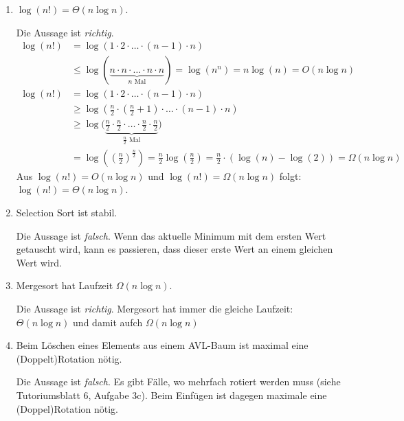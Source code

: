 \documentclass[11pt,a4paper]{article}
\begin{document}
\begin{loesung}
    \begin{enumerate}
        \item $\log(n!) = \Theta(n \log n)$.

        Die Aussage ist \emph{richtig}.
        \begin{align*}
            \log(n!) &= \log(1 \cdot 2 \cdot \ldots \cdot (n - 1) \cdot n) \\
            &\leq \log(\underbrace{n \cdot n \cdot \ldots \cdot n \cdot n}_{\text{$n$ Mal}}) 
            = \log(n^n) = n \log(n) = O(n\log n )
        \end{align*}
        \begin{align*}
            \log(n!) &= \log(1 \cdot 2 \cdot \ldots \cdot (n - 1) \cdot n) \\
            &\geq \log\left(\frac{n}{2} \cdot \left(\frac{n}{2} + 1\right) \cdot \ldots \cdot (n - 1) \cdot n\right)  \\
            &\geq \log\Big(\underbrace{\frac{n}{2} \cdot \frac{n}{2} \cdot \ldots \cdot \frac{n}{2} \cdot \frac{n}{2}}_{\text{$\frac{n}{2}$ Mal}}\Big) \\
            &= \log\left(\left(\frac{n}{2}\right)^{\frac{n}{2}}\right)
            = \frac{n}{2} \log\left(\frac{n}{2}\right) 
            = \frac{n}{2} \cdot \left( \log(n) - \log(2) \right)
            = \Omega(n \log n )
        \end{align*}
        Aus $\log(n!) = O(n \log n)$ und $\log(n!) = \Omega(n \log n)$ folgt: $\log(n!) = \Theta(n \log n)$.
        \item Selection Sort ist stabil.

        Die Aussage ist \emph{falsch}.
        Wenn das aktuelle Minimum mit dem ersten Wert getauscht wird, kann es passieren, dass dieser erste Wert an einem gleichen Wert  wird.
        \item Mergesort hat Laufzeit $\Omega(n \log n)$.

        Die Aussage ist \emph{richtig}.
        Mergesort hat immer die gleiche Laufzeit: $\Theta(n \log n)$ und damit aufch $\Omega(n \log n)$
        \item Beim Löschen eines Elements aus einem AVL-Baum ist maximal eine (Doppelt)Rotation nötig.

        Die Aussage ist \emph{falsch}.
        Es gibt Fälle, wo mehrfach rotiert werden muss (siehe Tutoriumsblatt 6, Aufgabe 3c).
        Beim Einfügen ist dagegen maximale eine (Doppel)Rotation nötig.


\end{enumerate}
\end{loesung}
\end{document}
